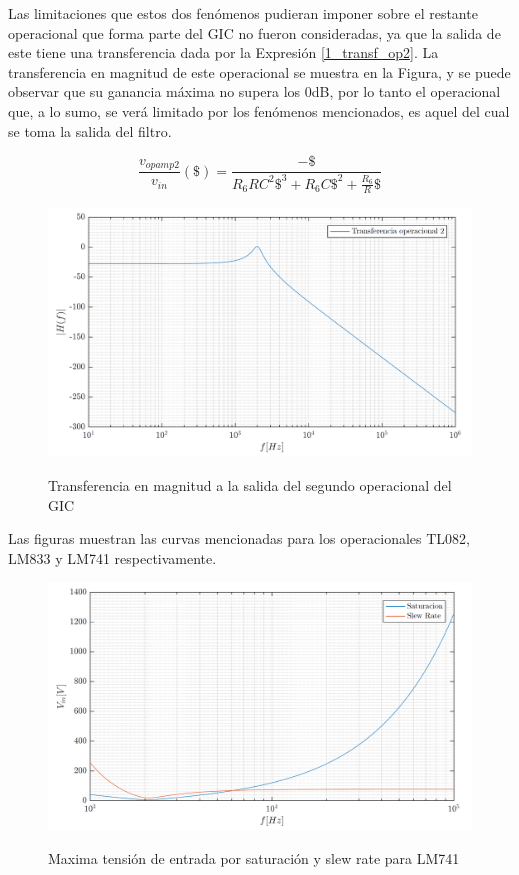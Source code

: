 Las limitaciones que estos dos fenómenos pudieran imponer sobre el restante operacional que forma parte del GIC no fueron consideradas, ya que la salida de este tiene una transferencia dada por la Expresión \ref{1_transf_op2}. La transferencia en magnitud de este operacional se muestra en la Figura, y se puede observar que su ganancia máxima no supera los 0dB, por lo tanto el operacional que, a lo sumo, se verá limitado por los fenómenos mencionados, es aquel del cual se toma la salida del filtro.

\begin{equation}
\frac{v_{opamp2}}{v_{in}}(\$) = \frac{-\$}{R_6RC^2\$^3 + R_6C\$^2 + \frac{R_6}{R}\$}
\label{1_transf_op2} 
\end{equation}

\begin{figure}[H]
\centering
\includegraphics[scale=0.4]{../parte1/informe/resources/bode_segundo_opamp}
\label{1_bode_opamp2}
\caption{Transferencia en magnitud a la salida del segundo operacional del GIC}
\end{figure}

Las figuras muestran las curvas mencionadas para los operacionales TL082, LM833 y LM741 respectivamente.

\begin{figure}[H]
\centering
\includegraphics[scale=0.4]{../parte1/informe/resources/vin_max_LM741}
\label{1_vin_max_LM741}
\caption{Maxima tensión de entrada por saturación y slew rate para LM741}
\end{figure}

